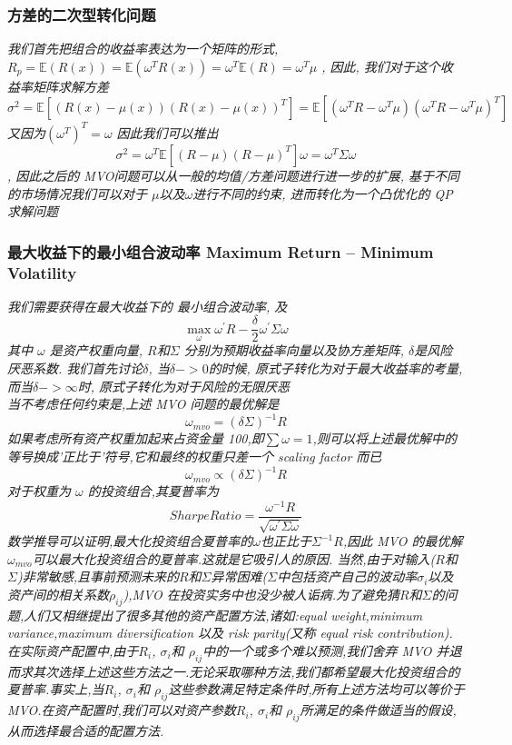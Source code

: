\documentclass{scrartcl}
\numberwithin{equation}{section}   %
\begin{document}
\subsubsection{方差的二次型转化问题}
\textsl{
我们首先把组合的收益率表达为一个矩阵的形式, $R_p =  \mathbb{E} (R(x)) = \mathbb{E} (\omega^T R(x)) =\omega^T \mathbb{E} (R) =  \omega^T \mu$ , 因此, 我们对于这个收益率矩阵求解方差 $$\sigma^2  = \mathbb{E}[(R(x) - \mu (x))(R(x) - \mu (x))^T]= \mathbb{E}[(\omega^T R - \omega^T \mu)(\omega^T R - \omega^T \mu)^T]$$ 又因为$(\omega^T)^T = \omega$ 因此我们可以推出$$ \sigma^2  = \omega^T  \mathbb{E}[ (R- \mu) (R- \mu)^T] \omega = \omega^T \Sigma \omega$$, 因此之后的 MVO问题可以从一般的均值/方差问题进行进一步的扩展, 基于不同的市场情况我们可以对于 $\mu$以及$\omega$进行不同的约束, 进而转化为一个凸优化的 QP 求解问题
}


\subsubsection{最大收益下的最小组合波动率 Maximum Return – Minimum Volatility}
\textsl{我们需要获得在最大收益下的 最小组合波动率, 及
    $$\max_\omega \omega^{'} R - \frac{\delta }{2} \omega^{'}  \Sigma \omega $$其中 $\omega$ 是资产权重向量, $R$和$\Sigma$ 分别为预期收益率向量以及协方差矩阵, $\delta$是风险厌恶系数.
    我们首先讨论$\delta$, 当$\delta -> 0 $的时候, 原式子转化为对于最大收益率的考量, 而当$\delta -> \infty$时, 原式子转化为对于风险的无限厌恶\\
    当不考虑任何约束是,上述 MVO 问题的最优解是
    $$\omega_{mvo} = (\delta \Sigma)^{-1}R $$
    如果考虑所有资产权重加起来占资金量 100,即$\sum\omega =1$,则可以将上述最优解中的等号换成'正比于'符号,它和最终的权重只差一个 scaling factor 而已
    $$\omega_{mvo} \propto (\delta \Sigma)^{-1}R $$
    对于权重为 $\omega$ 的投资组合,其夏普率为
    $$SharpeRatio = \frac{\omega^{-1}R}{\sqrt{\omega^{'}  \Sigma \omega}}$$
    数学推导可以证明,最大化投资组合夏普率的$\omega$也正比于$\Sigma^{-1}R$,因此 MVO 的最优解$\omega_{mvo}$可以最大化投资组合的夏普率.这就是它吸引人的原因.
    当然,由于对输入($R$和$\Sigma$)非常敏感,且事前预测未来的$R$和$\Sigma$异常困难($\Sigma$中包括资产自己的波动率$\sigma_i$以及资产间的相关系数$\rho_{ij}$),MVO 在投资实务中也没少被人诟病.为了避免猜$R$和$\Sigma$的问题,人们又相继提出了很多其他的资产配置方法,诸如:equal weight,minimum variance,maximum diversification 以及 risk parity(又称 equal risk contribution).
    在实际资产配置中,由于$R_i$, $\sigma_i$和 $\rho_{ij}$中的一个或多个难以预测,我们舍弃 MVO 并退而求其次选择上述这些方法之一.无论采取哪种方法,我们都希望最大化投资组合的夏普率.事实上,当$R_i$, $\sigma_i$和 $\rho_{ij}$这些参数满足特定条件时,所有上述方法均可以等价于 MVO.在资产配置时,我们可以对资产参数$R_i$, $\sigma_i$和 $\rho_{ij}$所满足的条件做适当的假设,从而选择最合适的配置方法.}
\end{document}
